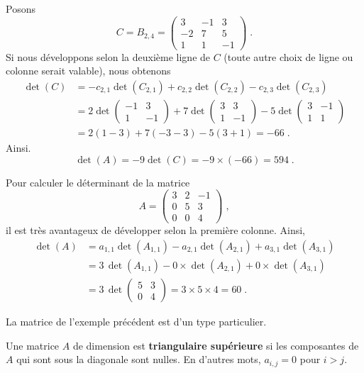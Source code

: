 {\begin{egg}
Posons
\[
C = B_{2,4} =
\begin{pmatrix} 3 & -1 & 3 \\ -2 & 7 & 5 \\ 1 & 1 & -1 \end{pmatrix} \; .
\]
Si nous développons selon la deuxième ligne de $C$ (toute autre choix de
ligne ou colonne serait valable), nous obtenons
\begin{align*}
\det(C) &= - c_{2,1} \det(C_{2,1}) + c_{2,2} \det(C_{2,2})
- c_{2,3} \det(C_{2,3}) \\
&= 2 \det\begin{pmatrix} -1 & 3 \\ 1 & -1 \end{pmatrix}
+ 7 \det\begin{pmatrix} 3 & 3 \\ 1 & -1 \end{pmatrix}
-5 \det\begin{pmatrix} 3 & -1\\ 1 & 1\end{pmatrix} \\
&= 2 ( 1 -3) + 7(-3-3) -5 (3+1) = -66 \; .
\end{align*}
Ainsi.
\[
\det(A) = -9 \det(C) = -9\times (-66) = 594 \; .
\]
\end{egg}

\begin{egg}
Pour calculer le déterminant de la matrice
\[
A= \begin{pmatrix} 3 & 2 & -1 \\ 0 & 5 & 3 \\
0 & 0 & 4 \end{pmatrix} \; ,
\]
il est très avantageux de développer selon la première colonne.  Ainsi,
\begin{align*}
\det(A) &= a_{1,1} \det(A_{1,1}) - a_{2,1} \det(A_{2,1})
+ a_{3,1}\det(A_{3,1}) \\
&= 3\, \det(A_{1,1}) - 0\times \det(A_{2,1}) + 0\times \det(A_{3,1}) \\
&= 3\, \det\begin{pmatrix} 5 & 3 \\ 0 & 4 \end{pmatrix}
= 3\times 5\times 4 = 60 \; .
\end{align*}
\end{egg}

La matrice de l'exemple précédent est d'un type particulier.

\begin{focus}{\dfn}
Une matrice $A$ de dimension \nn est
{\bfseries triangulaire supérieure} si les composantes de $A$ qui sont sous la diagonale
sont nulles.  En d'autres mots, $a_{i,j} =0$ pour $i>j$.


\end{focus}}
